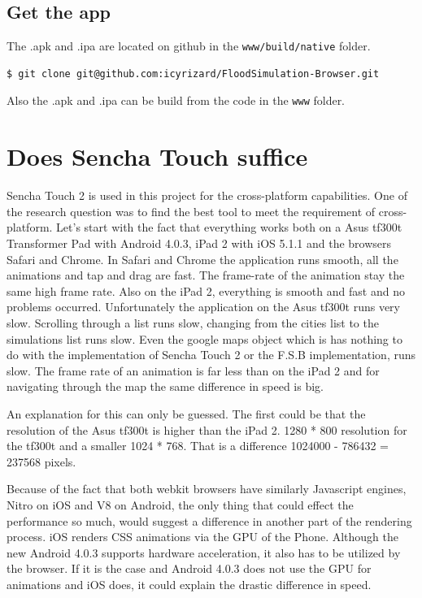 \subsection{Get the app}
The .apk and .ipa are located on github in the \texttt{www/build/native} folder. \\
\begin{lstlisting}
$ git clone git@github.com:icyrizard/FloodSimulation-Browser.git
\end{lstlisting}
Also the .apk and .ipa can be build from the code in the \texttt{www} folder. \\


\section{Does Sencha Touch suffice}
\label{sec:suffice}
Sencha Touch 2 is used in this project for the cross-platform capabilities. One of the research question was to find the best tool to meet the requirement of cross-platform. Let's start with the fact that everything works both on a Asus tf300t Transformer Pad with Android 4.0.3, iPad 2 with iOS 5.1.1 and the browsers Safari and Chrome. In Safari and Chrome the application runs smooth, all the animations and tap and drag are fast. The frame-rate of the animation stay the same high frame rate. Also on the iPad 2, everything is smooth and fast and no problems occurred. Unfortunately the application on the Asus tf300t runs very slow. Scrolling through a list runs slow, changing from the cities list to the simulations list runs slow. Even the google maps object which is has nothing to do with the implementation of Sencha Touch 2 or the F.S.B implementation, runs slow. The frame rate of an animation is far less than on the iPad 2 and for navigating through the map the same difference in speed is big. 

An explanation for this can only be guessed. The first could be that the resolution of the Asus tf300t is higher than the iPad 2. 1280 * 800 resolution for the tf300t and a smaller 1024 * 768. That is a difference 1024000 - 786432 = 237568 pixels. 

Because of the fact that both webkit browsers have similarly Javascript engines, Nitro on iOS and V8 on Android, the only thing that could effect the performance so much, would suggest a difference in another part of the rendering process. iOS renders CSS animations via the GPU of the Phone. Although the new Android 4.0.3 supports hardware acceleration, it also has to be utilized by the browser. If it is the case and Android 4.0.3 does not use the GPU for animations and iOS does, it could explain the drastic difference in speed. 

